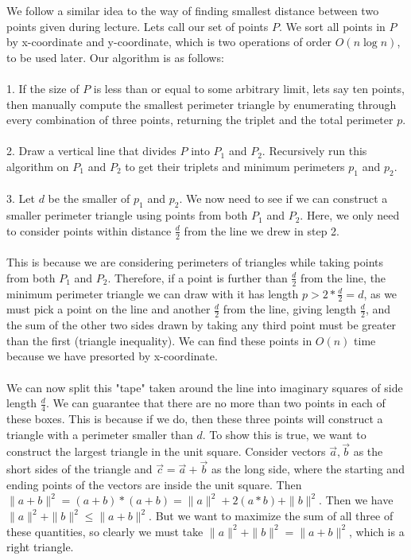 We follow a similar idea to the way of finding smallest distance between two points given during lecture. Lets call our set of points $P$. We sort all points in $P$ by x-coordinate and y-coordinate, which is two operations of order $O(n \log n)$, to be used later.
Our algorithm is as follows: \\ \\ 
1. If the size of $P$ is less than or equal to some arbitrary limit, lets say ten points, then manually compute the smallest perimeter triangle by enumerating through every combination of three points, returning the triplet and the total perimeter $p$. \\ \\
2. Draw a vertical line that divides $P$ into $P_1$ and $P_2$. Recursively run this algorithm on $P_1$ and $P_2$ to get their triplets and minimum perimeters $p_1$ and $p_2$. \\ \\ 
3. Let $d$ be the smaller of $p_1$ and $p_2$. We now need to see if we can construct a smaller perimeter triangle using points from both $P_1$ and $P_2$. Here, we only need to consider points within distance $\frac{d}{2}$ from the line we drew in step 2. 
\\ \\ This is because we are considering perimeters of triangles while taking points from both $P_1$ and $P_2$. Therefore, if a point is further than $\frac{d}{2}$ from the line, the minimum perimeter triangle we can draw with it has length $p > 2 * \frac{d}{2} = d$, as we must pick a point on the line and another $\frac{d}{2}$ from the line, giving length $\frac{d}{2}$, and the sum of the other two sides drawn by taking any third point must be greater than the first (triangle inequality).
We can find these points in $O(n)$ time because we have presorted by x-coordinate.
\\ \\ We can now split this "tape" taken around the line into imaginary squares of side length $\frac{d}{4}$. We can guarantee that there are no more than two points in each of these boxes. This is because if we do, then these three points will construct a triangle with a perimeter smaller than $d$.
To show this is true, we want to construct the largest triangle in the unit square. Consider vectors $\vec{a}, \vec{b}$ as the short sides of the triangle and $\vec{c}=\vec{a}+\vec{b}$ as the long side, where the starting and ending points of the vectors are inside the unit square. Then $\|a+b\|^2=(a+b)*(a+b)=\|a\|^2+2(a*b)+\|b\|^2$. Then we have $\|a\|^2+\|b\|^2\le \|a+b\|^2$. But we want to maximize the sum of all three of these quantities, so clearly we must take $\|a\|^2+\|b\|^2=\|a+b\|^2$, which is a right triangle. 
